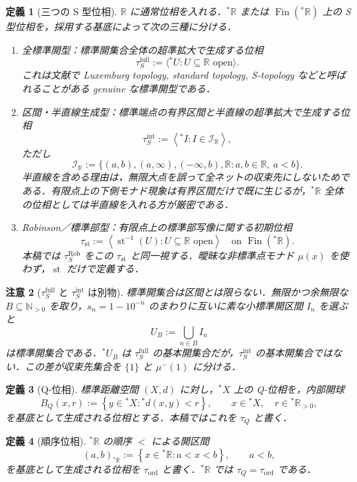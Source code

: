 \documentclass[a4paper,11pt]{ltjsarticle}
\theoremstyle{jpdef}
\newtheorem{definition}{定義}[section]
\newtheorem{warning}[definition]{注意}
\theoremstyle{jpthm}
\newcommand{\N}{\mathbb{N}}
\newcommand{\R}{\mathbb{R}}
\newcommand{\st}{\operatorname{st}}
\newcommand{\Fin}{\operatorname{Fin}}
\newcommand{\Ns}{\N_{>0}}
\newcommand{\set}[1]{\left\{#1\right\}}
\newcommand{\ulim}[1]{{}^{\ast}#1}
\newcommand{\taufullS}{\tau^{\mathrm{full}}_{S}}
\newcommand{\tauintS}{\tau^{\mathrm{int}}_{S}}
\newcommand{\taust}{\tau_{\mathrm{st}}}
\newcommand{\tauRobS}{\tau^{\mathrm{Rob}}_{S}}
\newcommand{\tauQ}{\tau_{Q}}
\newcommand{\tauord}{\tau_{\mathrm{ord}}}
\begin{document}
\begin{definition}[三つの S 型位相]
\(\R\) に通常位相を入れる．\(\ulim\R\) または \(\Fin(\ulim\R)\) 上の S 型位相を，採用する基底によって次の三種に分ける．
\begin{enumerate}
\item 全標準開型：標準開集合全体の超準拡大で生成する位相
\[
  \taufullS:=\langle\ulim U:U\subseteq\R\text{ open}\rangle.
\]
これは文献で Luxemburg topology, standard topology, S-topology などと呼ばれることがある genuine な標準開型である．
\item 区間・半直線生成型：標準端点の有界区間と半直線の超準拡大で生成する位相
\[
  \tauintS
  :=\left\langle\ulim I:I\in\mathcal I_{\R}\right\rangle,
\]
ただし
\[
  \mathcal I_{\R}:=\{(a,b),(a,\infty),(-\infty,b),\R:a,b\in\R,\ a<b\}.
\]
半直線を含める理由は，無限大点を誤って全ネットの収束先にしないためである．有限点上の下側モナド現象は有界区間だけで既に生じるが，\(\ulim\R\) 全体の位相としては半直線を入れる方が厳密である．
\item Robinson／標準部型：有限点上の標準部写像に関する初期位相
\[
  \taust:=\left\langle \st^{-1}(U):U\subseteq\R\text{ open}\right\rangle
  \quad\text{on }\Fin(\ulim\R).
\]
本稿では \(\tauRobS\) をこの \(\taust\) と同一視する．曖昧な非標準点モナド \(\mu(x)\) を使わず，\(\st\) だけで定義する．
\end{enumerate}
\end{definition}

\begin{warning}[\(\taufullS\) と \(\tauintS\) は別物]
標準開集合は区間とは限らない．無限かつ余無限な \(B\subseteq\Ns\) を取り，\(s_n=1-10^{-n}\) のまわりに互いに素な小標準開区間 \(I_n\) を選ぶと
\[
  U_B:=\bigcup_{n\in B}I_n
\]
は標準開集合である．\(\ulim U_B\) は \(\taufullS\) の基本開集合だが，\(\tauintS\) の基本開集合ではない．この差が収束先集合を \(\{1\}\) と \(\mu^-(1)\) に分ける．
\end{warning}

\begin{definition}[Q-位相]
標準距離空間 \((X,d)\) に対し，\(\ulim X\) 上の Q-位相を，内部開球
\[
  B_Q(x,r):=\set{y\in\ulim X:\ulim d(x,y)<r},
  \qquad x\in\ulim X,\quad r\in\ulim\R_{>0},
\]
を基底として生成される位相とする．本稿ではこれを \(\tauQ\) と書く．
\end{definition}

\begin{definition}[順序位相]
\(\ulim\R\) の順序 \(<\) による開区間
\[
  (a,b)_{\ulim\R}:=\set{x\in\ulim\R:a<x<b},
  \qquad a<b,
\]
を基底として生成される位相を \(\tauord\) と書く．\(\ulim\R\) では \(\tauQ=\tauord\) である．
\end{definition}
\end{document}
